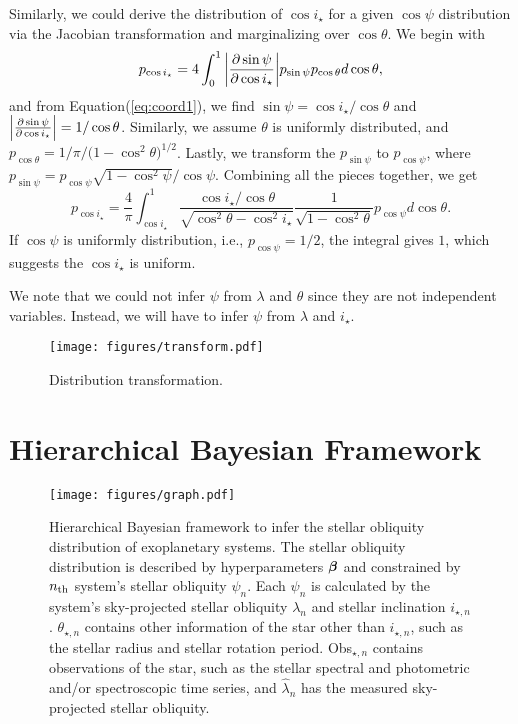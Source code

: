 \documentclass[twocolumn,times]{aastex631}
\begin{document}
Similarly, we could derive the distribution of $\cos{i_\star}$ for a given $\cos{\psi}$ distribution via the Jacobian transformation and marginalizing over $\cos{\theta}$. We begin with
\begin{equation}
    p_{\cos{i_\star}} = 4 \int_{0}^{1} \abs{\pdv{\sin{\psi}}{\cos{i_\star}}} p_{\sin{\psi}} p_{\cos{\theta}} d\cos{\theta},
\end{equation}
and from Equation(\ref{eq:coord1}), we find $\sin{\psi} = \cos{i_\star}/\cos{\theta}$ and $\abs{\pdv{\sin{\psi}}{\cos{i_\star}}} = 1/\cos{\theta}$. Similarly, we assume $\theta$ is uniformly distributed, and $p_{\cos{\theta}} = 1/\pi/(1-\cos^2{\theta)^{1/2}}$. Lastly, we transform the $p_{\sin{\psi}}$ to $p_{\cos{\psi}}$, where $p_{\sin{\psi}} = p_{\cos{\psi}}\sqrt{1-\cos^2{\psi}}/\cos{\psi}$. Combining all the pieces together, we get
\begin{equation}
    p_{\cos{i_\star}} = \frac{4}{\pi} \int_{\cos{i_\star}}^{1} \frac{\cos{i_\star}/\cos{\theta}}{\sqrt{\cos^2{\theta}-\cos^2{i_\star}}} \frac{1}{\sqrt{1-\cos^2{\theta}}} p_{\cos{\psi}} d\cos{\theta}.
\end{equation}
If $\cos{\psi}$ is uniformly distribution, i.e., $p_{\cos{\psi}} = 1/2$, the integral gives $1$, which suggests the $\cos{i_\star}$ is uniform.

We note that we could not infer $\psi$ from $\lambda$ and $\theta$ since they are not independent variables. Instead, we will have to infer $\psi$ from $\lambda$ and $i_\star$.

\begin{figure*}[ht!]
    \texttt{[image: figures/transform.pdf]}
    \caption{Distribution transformation.}
    \label{fig:transform}
\end{figure*}


\section{Hierarchical Bayesian Framework}\label{sec:hbm}

\begin{figure}[ht!]
    \texttt{[image: figures/graph.pdf]}
    \caption{Hierarchical Bayesian framework to infer the stellar obliquity distribution of exoplanetary systems. The stellar obliquity distribution is described by hyperparameters $\vb*{\beta}$ and constrained by $n_{\rm th}$ system's stellar obliquity $\psi_n$. Each $\psi_n$ is calculated by the system's sky-projected stellar obliquity $\lambda_n$ and stellar inclination $i_{\star, n}$. $\theta_{\star, n}$ contains other information of the star other than $i_{\star, n}$, such as the stellar radius and stellar rotation period. Obs$_{\star,n}$ contains observations of the star, such as the stellar spectral and photometric and/or spectroscopic time series, and $\hat{\lambda}_n$ has the measured sky-projected stellar obliquity.}
    \label{fig:graph}
\end{figure}
\end{document}
